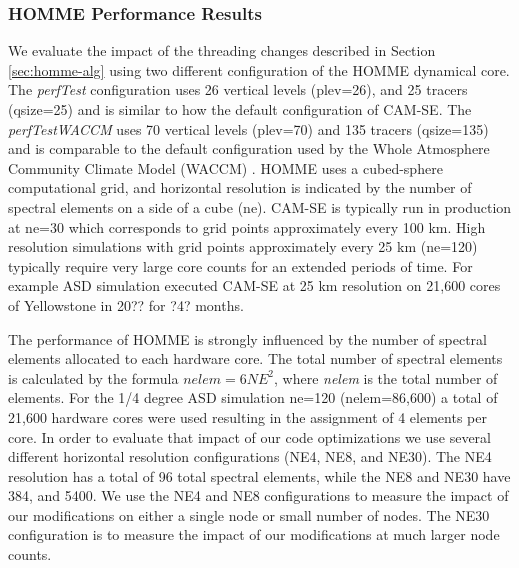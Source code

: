 \subsubsection{HOMME Performance Results}\label{sec:homme-results}

We evaluate the impact of the threading changes described in Section \ref{sec:homme-alg} using two different configuration of the HOMME dynamical core.  The {\em perfTest} configuration uses 26 vertical levels (plev=26), and 25 tracers (qsize=25) and is similar to how the default configuration of CAM-SE.  The {\em perfTestWACCM} uses 70 vertical levels (plev=70) and 135 tracers (qsize=135) and is comparable to the default configuration used by the Whole Atmosphere Community Climate Model (WACCM) \cite{waccm}.  HOMME uses a cubed-sphere computational grid, and horizontal resolution is indicated by the number of spectral elements on a side of a cube (ne). CAM-SE is typically run in production at ne=30 which corresponds to grid points approximately every 100 km.  High resolution simulations with grid points approximately every 25 km (ne=120) typically require very large core counts for an extended periods of time.   For example ASD simulation \cite{asd} executed CAM-SE at 25 km resolution on 21,600 cores of Yellowstone in 20?? for ?4? months.

The performance of HOMME is strongly influenced by the number of spectral elements allocated to each hardware core.  The total number of spectral elements is calculated by the formula $nelem= 6 NE^2$, where {\em nelem} is the total number of elements.   For the 1/4 degree ASD simulation \cite{asd} ne=120 (nelem=86,600) a total of 21,600 hardware cores were used resulting in the assignment of 4 elements per core. In order to evaluate that impact of our code optimizations we use several different horizontal resolution configurations (NE4, NE8, and NE30). The NE4 resolution has a total of 96 total spectral elements, while the NE8 and NE30 have 384, and 5400.  We use the NE4 and NE8 configurations to measure the impact of our modifications on either a single node or small number of nodes.  The NE30 configuration is to measure the impact of our modifications at much larger node counts.  


